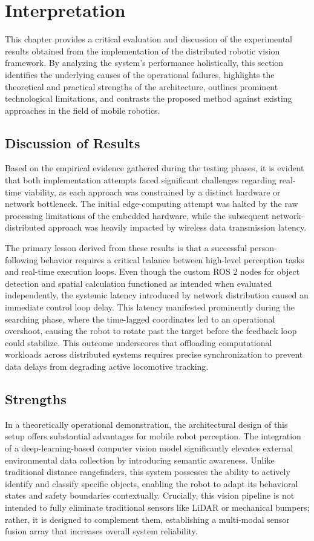 \chapter{Interpretation}
This chapter provides a critical evaluation and discussion of the experimental results obtained from the implementation of the distributed robotic vision framework. By analyzing the system's performance holistically, this section identifies the underlying causes of the operational failures, highlights the theoretical and practical strengths of the architecture, outlines prominent technological limitations, and contrasts the proposed method against existing approaches in the field of mobile robotics.

\section{Discussion of Results}
Based on the empirical evidence gathered during the testing phases, it is evident that both implementation attempts faced significant challenges regarding real-time viability, as each approach was constrained by a distinct hardware or network bottleneck. The initial edge-computing attempt was halted by the raw processing limitations of the embedded hardware, while the subsequent network-distributed approach was heavily impacted by wireless data transmission latency.

The primary lesson derived from these results is that a successful person-following behavior requires a critical balance between high-level perception tasks and real-time execution loops. Even though the custom ROS 2 nodes for object detection and spatial calculation functioned as intended when evaluated independently, the systemic latency introduced by network distribution caused an immediate control loop delay. This latency manifested prominently during the searching phase, where the time-lagged coordinates led to an operational overshoot, causing the robot to rotate past the target before the feedback loop could stabilize. This outcome underscores that offloading computational workloads across distributed systems requires precise synchronization to prevent data delays from degrading active locomotive tracking.

\section{Strengths}
In a theoretically operational demonstration, the architectural design of this setup offers substantial advantages for mobile robot perception. The integration of a deep-learning-based computer vision model significantly elevates external environmental data collection by introducing semantic awareness. Unlike traditional distance rangefinders, this system possesses the ability to actively identify and classify specific objects, enabling the robot to adapt its behavioral states and safety boundaries contextually. Crucially, this vision pipeline is not intended to fully eliminate traditional sensors like LiDAR or mechanical bumpers; rather, it is designed to complement them, establishing a multi-modal sensor fusion array that increases overall system reliability. 

